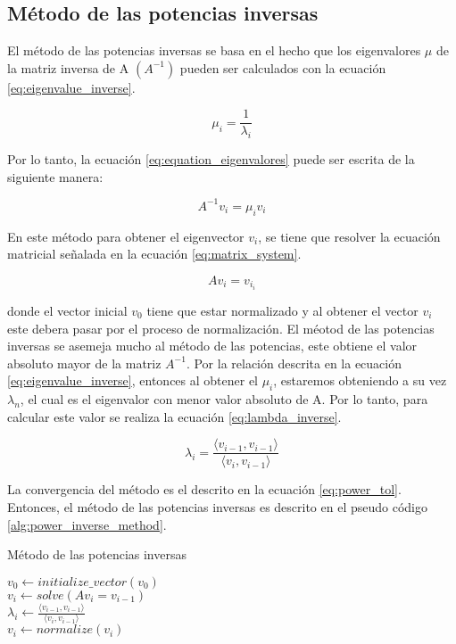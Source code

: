\subsection{Método de las potencias inversas}

El método de las potencias inversas se basa en el hecho que los eigenvalores $\mu$ de la matriz inversa de A $(A^{-1})$ pueden ser calculados con la ecuación \ref{eq:eigenvalue_inverse}.

\begin{equation}
    \mu_i = \frac{1}{\lambda_i} \label{eq:eigenvalue_inverse}
\end{equation}

Por lo tanto, la ecuación \ref{eq:equation_eigenvalores} puede ser escrita de la siguiente manera:

\begin{equation}
    A^{-1} v_i = \mu_i  v_i
\end{equation}

En este método para obtener el eigenvector $v_i$, se tiene que resolver la ecuación matricial señalada en la ecuación \ref{eq:matrix_system}.

\begin{equation}
    Av_{i} = v_{i_i} \label{eq:matrix_system}
\end{equation}

donde el vector inicial $v_0$ tiene que estar normalizado y al obtener el vector $v_{i}$ este debera pasar por el proceso de normalización. El méotod de las potencias inversas se asemeja mucho al método de las potencias, este obtiene el valor absoluto mayor de la matriz $A^{-1}$. Por la relación descrita en la ecuación \ref{eq:eigenvalue_inverse}, entonces al obtener el $\mu_i$, estaremos obteniendo a su vez $\lambda_n$, el cual es el eigenvalor con menor valor absoluto de A. Por lo tanto, para calcular este valor se realiza la ecuación \ref{eq:lambda_inverse}.

\begin{equation}
    \lambda_i = \frac{\langle v_{i-1}, v_{i-1}\rangle}{\langle v_i , v_{i-1}\rangle} \label{eq:lambda_inverse}
\end{equation}

La convergencia del método es el descrito en la ecuación \ref{eq:power_tol}. Entonces, el método de las potencias inversas es descrito en el pseudo código \ref{alg:power_inverse_method}.

\begin{algorithm}[H]
    \caption{Método de las potencias inversas}
    \label{alg:power_inverse_method}
    $v_0 \gets initialize\_vector(v_0)$ \\
    {
    $v_i \gets solve(Av_{i}=v_{i-1})$\\
    $\lambda_i \gets \frac{\langle v_{i-1} , v_{i-1}\rangle}{\langle v_{i}, v_{i-1}\rangle}$\\
    $v_i \gets normalize(v_i)$\\
    }
\end{algorithm}
